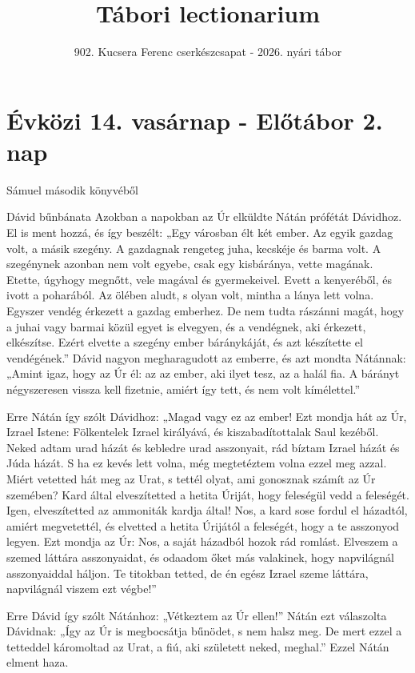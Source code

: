 \documentclass[twoside]{article}
\title{Tábori lectionarium}
\subtitle{902. Kucsera Ferenc cserkészcsapat - 2026. nyári tábor}
\begin{document}
\maketitle

\section*{Évközi 14. vasárnap - Előtábor 2. nap}

Sámuel második könyvéből

\begin{lectio}{Dávid bűnbánata}
\noindent Azokban a napokban az Úr elküldte Nátán prófétát Dávidhoz. El is ment hozzá, és így beszélt: „Egy városban élt két ember. Az egyik gazdag volt, a másik szegény. A gazdagnak rengeteg juha, kecskéje és barma volt. A szegénynek azonban nem volt egyebe, csak egy kisbáránya, vette magának. Etette, úgyhogy megnőtt, vele magával és gyermekeivel. Evett a kenyeréből, és ivott a poharából. Az ölében aludt, s olyan volt, mintha a lánya lett volna. Egyszer vendég érkezett a gazdag emberhez. De nem tudta rászánni magát, hogy a juhai vagy barmai közül egyet is elvegyen, és a vendégnek, aki érkezett, elkészítse. Ezért elvette a szegény ember báránykáját, és azt készítette el vendégének.” Dávid nagyon megharagudott az emberre, és azt mondta Nátánnak: „Amint igaz, hogy az Úr él: az az ember, aki ilyet tesz, az a halál fia. A bárányt négyszeresen vissza kell fizetnie, amiért így tett, és nem volt kímélettel.”

Erre Nátán így szólt Dávidhoz: „Magad vagy ez az ember! Ezt mondja hát az Úr, Izrael Istene: Fölkentelek Izrael királyává, és kiszabadítottalak Saul kezéből. Neked adtam urad házát és kebledre urad asszonyait, rád bíztam Izrael házát és Júda házát. S ha ez kevés lett volna, még megtetéztem volna ezzel meg azzal. Miért vetetted hát meg az Urat, s tettél olyat, ami gonosznak számít az Úr szemében? Kard által elveszítetted a hetita Úriját, hogy feleségül vedd a feleségét. Igen, elveszítetted az ammoniták kardja által! Nos, a kard sose fordul el házadtól, amiért megvetettél, és elvetted a hetita Úrijától a feleségét, hogy a te asszonyod legyen. Ezt mondja az Úr: Nos, a saját házadból hozok rád romlást. Elveszem a szemed láttára asszonyaidat, és odaadom őket más valakinek, hogy napvilágnál asszonyaiddal háljon. Te titokban tetted, de én egész Izrael szeme láttára, napvilágnál viszem ezt végbe!”

Erre Dávid így szólt Nátánhoz: „Vétkeztem az Úr ellen!” Nátán ezt válaszolta Dávidnak: „Így az Úr is megbocsátja bűnödet, s nem halsz meg. De mert ezzel a tetteddel káromoltad az Urat, a fiú, aki született neked, meghal.” Ezzel Nátán elment haza.


\end{lectio}
\end{document}
